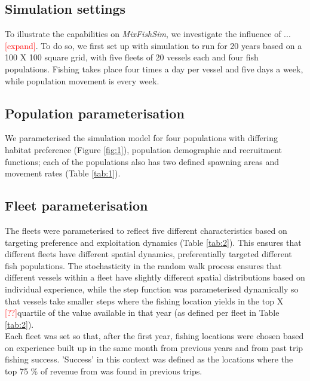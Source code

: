 \documentclass[review]{elsarticle}
\begin{document}
\subsection{Simulation settings}

To illustrate the capabilities on \emph{MixFishSim}, we investigate the
influence of ... \textcolor{red}{[expand]}. To do so, we first set up with
simulation to run for 20 years based on a 100 X 100 square grid, with five
fleets of 20 vessels each and four fish populations. Fishing takes place four
times a day per vessel and five days a week, while population movement is every
week.  

\subsection{Population parameterisation}

We parameterised the simulation model for four populations with differing
habitat preference (Figure \ref{fig:1}), population demographic and recruitment
functions; each of the populations also has two defined spawning areas and
movement rates (Table \ref{tab:1}). \\

\subsection{Fleet parameterisation}

The fleets were parameterised to reflect five different characteristics based
on targeting preference and exploitation dynamics (Table \ref{tab:2}). This
ensures that different fleets have different spatial dynamics, preferentially
targeted different fish populations. The stochasticity in the random walk
process ensures that different vessels within a fleet have slightly different
spatial distributions based on individual experience, while the step function
was parameterised dynamically so that vessels take smaller steps where the
fishing location yields in the top X \textcolor{red}{[??]}quartile of the value
available in that year (as defined per fleet in Table \ref{tab:2}). \\

Each fleet was set so that, after the first year, fishing locations were chosen
based on experience built up in the same month from previous years and from
past trip fishing success. 'Success' in this context was defined as the
locations where the top 75 \% of revenue from was found in previous trips. 
\end{document}

